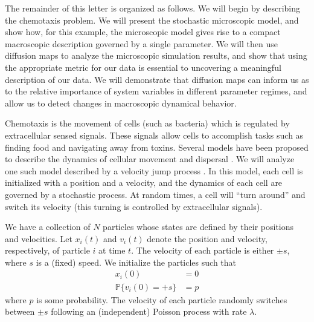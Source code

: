\documentclass[prl, reprint, final, showkeys]{revtex4-1}
\begin{document}
The remainder of this letter is organized as follows. We will begin by describing the chemotaxis problem.
%
We will present the stochastic microscopic model, and show how, for this example, the microscopic model gives rise to a compact macroscopic description governed by a single parameter.
%
We will then use diffusion maps to analyze the microscopic simulation results, and show that using the appropriate metric for our data is essential to uncovering a meaningful description of our data.
%
We will demonstrate that diffusion maps can inform us as to the relative importance of system variables in different parameter regimes, and allow us to detect changes in macroscopic dynamical behavior.



Chemotaxis is the movement of cells (such as bacteria) which is regulated by extracellular sensed signals.
%
These signals allow cells to accomplish tasks such as finding food and navigating away from toxins.
%
Several models have been proposed to describe the dynamics of cellular movement and dispersal \cite{othmer1988models, codling2008random}.
%
We will analyze one such model described by a velocity jump process \cite{othmer2000diffusion}.
%
In this model, each cell is initialized with a position and a velocity, and the dynamics of each cell are governed by a stochastic process.
%
At random times, a cell will ``turn around'' and switch its velocity (this turning is controlled by extracellular signals). 
%


We have a collection of $N$ particles whose states are defined by their positions and velocities. 
%
Let $x_i(t)$ and $v_i(t)$ denote the position and velocity, respectively, of particle $i$ at time $t$.
%
The velocity of each particle is either $\pm s$, where $s$ is a (fixed) speed. 
%
We initialize the particles such that
\begin{equation}
\begin{aligned}
x_i(0) & = 0 \\
\mathbb{P} \{ v_i(0) = +s \} & = p
\end{aligned}
\end{equation}
where $p$ is some probability.
%
The velocity of each particle randomly switches between $\pm s$ following an (independent) Poisson process with rate $\lambda$.
%
\end{document}
